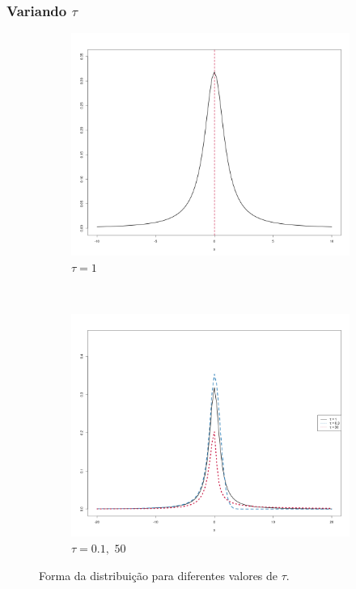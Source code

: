 \documentclass[13pt, aspectratio=169]{beamer}
\begin{document}
\begin{frame}
    \frametitle{Variando $\tau$}

    \begin{figure}[!ht]
        \centering
        \begin{subfigure}[t]{0.43\textwidth}
            \centering
            \includegraphics[width=\textwidth]{images/variando_mu_1.png}
            \caption{$\tau = 1$}
        \end{subfigure}%
        ~
        \begin{subfigure}[t]{0.43\textwidth}
            \centering
            \includegraphics[width=\textwidth]{images/variando_tau_2.png}
            \caption{$\tau = 0.1, \,\, 50$}
        \end{subfigure}%
        \caption{Forma da distribuição para diferentes valores de $\tau$.}
    \end{figure}
\end{frame}
\end{document}
